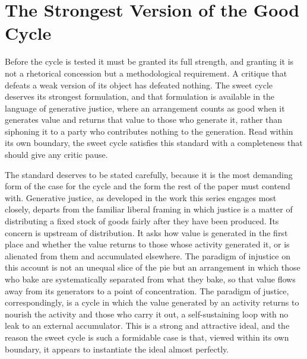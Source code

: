 \section{The Strongest Version of the Good Cycle}

Before the cycle is tested it must be granted its full strength, and granting it is not a rhetorical concession but a methodological requirement. A critique that defeats a weak version of its object has defeated nothing. The sweet cycle deserves its strongest formulation, and that formulation is available in the language of generative justice, where an arrangement counts as good when it generates value and returns that value to those who generate it, rather than siphoning it to a party who contributes nothing to the generation. Read within its own boundary, the sweet cycle satisfies this standard with a completeness that should give any critic pause.

The standard deserves to be stated carefully, because it is the most demanding form of the case for the cycle and the form the rest of the paper must contend with. Generative justice, as developed in the work this series engages most closely, departs from the familiar liberal framing in which justice is a matter of distributing a fixed stock of goods fairly after they have been produced. Its concern is upstream of distribution. It asks how value is generated in the first place and whether the value returns to those whose activity generated it, or is alienated from them and accumulated elsewhere. The paradigm of injustice on this account is not an unequal slice of the pie but an arrangement in which those who bake are systematically separated from what they bake, so that value flows away from its generators to a point of concentration. The paradigm of justice, correspondingly, is a cycle in which the value generated by an activity returns to nourish the activity and those who carry it out, a self-sustaining loop with no leak to an external accumulator. This is a strong and attractive ideal, and the reason the sweet cycle is such a formidable case is that, viewed within its own boundary, it appears to instantiate the ideal almost perfectly.

